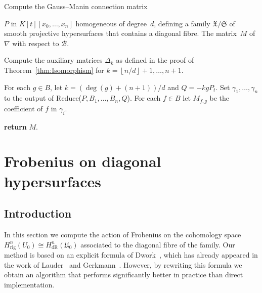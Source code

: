 \documentclass[a4paper,11pt]{article}
\numberwithin{equation}{section}
\providecommand{\floor}[1]{\left\lfloor#1\right\rfloor}   %
\providecommand{\HdR}{H_{\text{dR}}}    %
\providecommand{\Hrig}{H_{\text{rig}}}  %
\providecommand{\cB}{\mathcal{B}} %
\theoremstyle{definition}
\begin{document}
\begin{algorithm}
\caption{Compute the Gauss--Manin connection matrix}
\label{alg:Connection}
\begin{algorithmic}
\Require $P$ in $K[t][x_0, \dotsc, x_n]$ homogeneous of degree~$d$, 
         defining a family $\mathfrak{X}/\mathfrak{S}$ of smooth projective 
         hypersurfaces that contains a diagonal fibre.
\Ensure  The matrix~$M$ of $\nabla$ with respect to $\cB$.
\State \begin{compactenum}[\it {Step} I.] \vspace{-1.24em}
\item Compute the auxiliary matrices $\Delta_k$  as defined 
      in the proof of Theorem~\ref{thm:Isomorphism}
      for $k = \floor{n/d}+1, \dotsc, n+1$.
\item For each $g \in B$, let $k = (\deg(g)+(n+1))/d$ and $Q = - k g P_t$. 
      Set $\gamma_{1}, \dotsc, \gamma_n$ to the output of 
      {\sc Reduce($P, B_1, \dotsc, B_n, Q$)}. For each $f \in B$ let $M_{f,g}$ 
      be the coefficient of $f$ in $\gamma_i$.
\item \textbf{return} $M$.
\end{compactenum}
\EndProcedure
\end{algorithmic}
\end{algorithm}



\section{Frobenius on diagonal hypersurfaces}
\label{sec:Diagonal}

\subsection{Introduction}

In this section we compute the action of Frobenius on the cohomology 
space $\Hrig^{n}(U_0) \cong \HdR^{n}(\mathfrak{U}_0)$ associated 
to the diagonal fibre of the family. Our method is based on an 
explicit formula of Dwork~\citep[\S 4]{Dwork1964}, which has already 
appeared in the work of Lauder~\citep[\S 6]{Lauder2004b} and 
Gerkmann~\citep[\S 4.4]{Gerkmann2007}. However, by rewriting this formula 
we obtain an algorithm that performs significantly better in practice 
than direct implementation.
\end{document}
